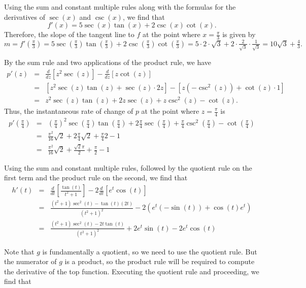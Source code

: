 \begin{activitySolution}
\ba
	\item Using the sum and constant multiple rules along with the formulas for the derivatives of $\sec(x)$ and $\csc(x)$, we find that
	$$f'(x) = 5 \sec(x)\tan(x) + 2\csc(x)\cot(x).$$  Therefore, the slope of the tangent line to $f$ at the point where $x =\frac{\pi}{3}$ is given by $m = f'(\frac{\pi}{3}) =  5 \sec(\frac{\pi}{3})\tan(\frac{\pi}{3}) + 2\csc(\frac{\pi}{3})\cot(\frac{\pi}{3}) = 5 \cdot 2 \cdot \sqrt{3} + 2 \cdot \frac{2}{\sqrt{3}} \cdot \frac{1}{\sqrt{3}} = 10\sqrt{3} + \frac{4}{3}.$
	\item By the sum rule and two applications of the product rule, we have
	\begin{eqnarray*}
	p'(z) & = & \frac{d}{dz}[z^2\sec(z)] - \frac{d}{dz}[z\cot(z)] \\  
	       & = &  [z^2 \sec(z) \tan(z) + \sec(z) \cdot 2z] - [z(-\csc^2(z)) + \cot(z) \cdot 1] \\
	       & = &  z^2 \sec(z) \tan(z) + 2z\sec(z) + z\csc^2(z) - \cot(z).
	\end{eqnarray*}
	Thus, the instantaneous rate of change of $p$ at the point where $z = \frac{\pi}{4}$ is
	\begin{eqnarray*}
	p'(\frac{\pi}{4}) & = &  (\frac{\pi}{4})^2 \sec(\frac{\pi}{4}) \tan(\frac{\pi}{4}) + 2\frac{\pi}{4}\sec(\frac{\pi}{4}) + \frac{\pi}{4}\csc^2(\frac{\pi}{4}) - \cot(\frac{\pi}{4}) \\
	 		     & = &  \frac{\pi^2}{16} \sqrt{2} + 2\frac{\pi}{4}\sqrt{2} + \frac{\pi}{4}2 - 1 \\
			     & = &  \frac{\pi^2}{16} \sqrt{2} + \frac{\sqrt{2}\pi}{2} + \frac{\pi}{2} - 1 
	\end{eqnarray*}
        \item Using the sum and constant multiple rules, followed by the quotient rule on the first term and the product rule on the second, we find that
        \begin{eqnarray*}
        		h'(t) & = & \frac{d}{dt}\left[ \frac{\tan (t)}{t^2+1} \right] - 2\frac{d}{dt}\left[e^t \cos(t)\right] \\
		       & = & \frac{(t^2+1) \sec^2(t) - \tan(t) (2t)}{(t^2 + 1)^2} - 2(e^t(-\sin(t)) + \cos(t)e^t) \\
		       & = &  \frac{(t^2+1) \sec^2(t) - 2t \tan(t)}{(t^2 + 1)^2} + 2e^t \sin(t) - 2 e^t\cos(t)
	\end{eqnarray*} 
        \item Note that $g$ is fundamentally a quotient, so we need to use the quotient rule.  But the numerator of $g$ is a product, so the product rule will be required to compute the derivative of the top function.  Executing the quotient rule and proceeding, we find that

\end{activitySolution}
